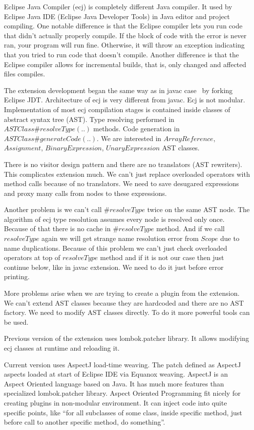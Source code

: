\documentclass{aircc}
\begin{document}
Eclipse Java Compiler (ecj) is completely different Java compiler.
It used by Eclipse Java IDE (Eclipse Java Developer Tools) in Java editor and project compiling.
One notable difference is that the Eclipse compiler lets you run code that didn't actually properly compile. 
If the block of code with the error is never ran, your program will run fine. 
Otherwise, it will throw an exception indicating that you tried to run code that doesn't compile.
Another difference is that the Eclipse compiler allows for incremental builds, that is, only changed and affected files compiles.

The extension development began the same way as in javac case \textemdash~by forking Eclipse JDT\cite{eclipse.jdt-oo}.
Architecture of ecj is very different from javac. Ecj is not modular.
Implementation of most ecj compilation stages is contained inside classes of abstract syntax tree (AST).
Type resolving performed in $ASTClass\#resolveType(..)$ methods.
Code generation in $ASTClass\#generateCode(..)$.
We are interested in $ArrayReference$,  $Assignment$, $BinaryExpression$, $UnaryExpression$ AST classes.

There is no visitor design pattern and there are no translators (AST rewriters).
This complicates extension much.
We can't just replace overloaded operators with method calls because of no translators.
We need to save desugared expressions and proxy many calls from nodes to these expressions.

Another problem is we can't call $\#resolveType$ twice on the same AST node.
The algorithm of ecj type resolution assumes every node is resolved only once.
Because of that there is no cache in $\#resolveType$ method. 
And if we call $resolveType$ again we will get strange name resolution error from $Scope$ due to name duplications.
Because of this problem we can't just check overloaded operators at top of $resolveType$ method
and if it is not our case then just continue below, like in javac extension.
We need to do it just before error printing.

More problems arise when we are trying to create a plugin from the extension.
We can't extend AST classes because they are hardcoded and there are no AST factory.
We need to modify AST classes directly. To do it more powerful tools can be used.

Previous version of the extension\cite{lombok-oo} uses lombok.patcher\cite{lombok.patcher} library.
It allows modifying ecj classes at runtime and reloading it.

Current version uses AspectJ load-time weaving\cite{AJLTW}. 
The patch defined as AspectJ aspects loaded at start of Eclipse IDE via Equanox weaving\cite{EquanoxW}.
AspectJ is an Aspect Oriented language based on Java.
It has much more features than specialized lombok.patcher library.
Aspect Oriented Programming fit nicely for creating plugins in non-modular environment.
It can inject code into quite specific points, like ``for all subclasses of some class, inside specific method, just before call to another specific method, do something''.
\end{document}
